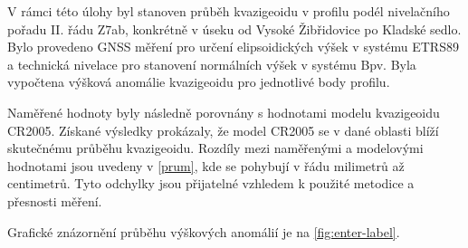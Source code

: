 \tab  V rámci této úlohy byl stanoven průběh kvazigeoidu v profilu podél nivelačního pořadu II. řádu Z7ab, konkrétně v úseku od Vysoké Žibřidovice po Kladské sedlo. Bylo provedeno GNSS měření pro určení elipsoidických výšek v systému ETRS89 a technická nivelace pro stanovení normálních výšek v systému Bpv. Byla vypočtena výšková anomálie kvazigeoidu pro jednotlivé body profilu.

Naměřené hodnoty byly následně porovnány s hodnotami modelu kvazigeoidu CR2005. Získané výsledky prokázaly, že model CR2005 se v dané oblasti blíží skutečnému průběhu kvazigeoidu. Rozdíly mezi naměřenými a modelovými hodnotami jsou uvedeny v \ref{prum}, kde se pohybují v řádu milimetrů až centimetrů. Tyto odchylky jsou přijatelné vzhledem k použité metodice a přesnosti měření.

Grafické znázornění průběhu výškových anomálií je na \ref{fig:enter-label}.